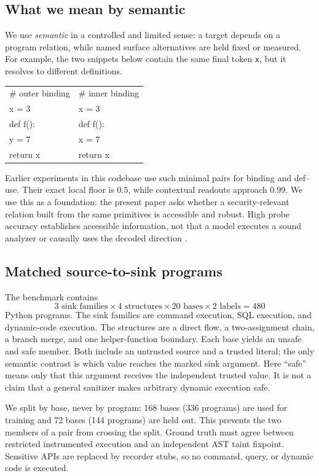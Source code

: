 \documentclass{article}
\begin{document}
\subsection{What we mean by semantic}
We use \emph{semantic} in a controlled and limited sense: a target depends on a program relation, while named surface alternatives are held fixed or measured. For example, the two snippets below contain the same final token \texttt{x}, but it resolves to different definitions.
\begin{center}
{\ttfamily\scriptsize
\begin{tabular}{ll}
\# outer binding & \# inner binding\\
x = 3 & x = 3\\
def f(): & def f():\\
\quad y = 7 & \quad x = 7\\
\quad return x & \quad return x
\end{tabular}}
\end{center}
Earlier experiments in this codebase use such minimal pairs for binding and def--use. Their exact local floor is 0.5, while contextual readouts approach 0.99. We use this as a foundation: the present paper asks whether a security-relevant relation built from the same primitives is accessible and robust. High probe accuracy establishes accessible information, not that a model executes a sound analyzer or causally uses the decoded direction \cite{hewitt2019control}.

\subsection{Matched source-to-sink programs}
The benchmark contains
\[
3\text{ sink families}\times4\text{ structures}\times20\text{ bases}\times2\text{ labels}=480
\]
Python programs. The sink families are command execution, SQL execution, and dynamic-code execution. The structures are a direct flow, a two-assignment chain, a branch merge, and one helper-function boundary. Each base yields an unsafe and safe member. Both include an untrusted source and a trusted literal; the only semantic contrast is which value reaches the marked sink argument. Here ``safe'' means only that this argument receives the independent trusted value. It is not a claim that a general sanitizer makes arbitrary dynamic execution safe.

We split by base, never by program: 168 bases (336 programs) are used for training and 72 bases (144 programs) are held out. This prevents the two members of a pair from crossing the split. Ground truth must agree between restricted instrumented execution and an independent AST taint fixpoint. Sensitive APIs are replaced by recorder stubs, so no command, query, or dynamic code is executed.
\end{document}
